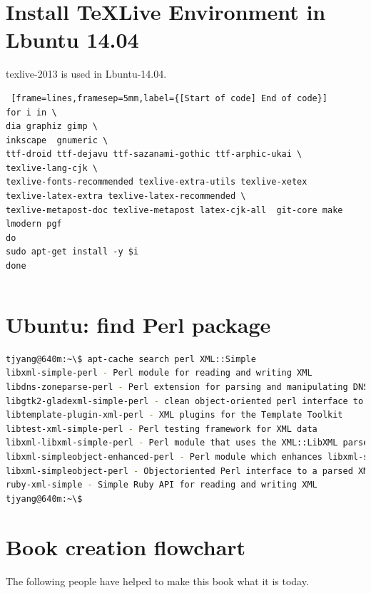 \section{Install \TeX Live Environment in Lbuntu 14.04}
texlive-2013 is used in Lbuntu-14.04.

\begin{Verbatim} [frame=lines,framesep=5mm,label={[Start of code] End of code}]
for i in \
dia graphiz gimp \
inkscape  gnumeric \
ttf-droid ttf-dejavu ttf-sazanami-gothic ttf-arphic-ukai \
texlive-lang-cjk \
texlive-fonts-recommended texlive-extra-utils texlive-xetex 
texlive-latex-extra texlive-latex-recommended \
texlive-metapost-doc texlive-metapost latex-cjk-all  git-core make lmodern pgf
do 
sudo apt-get install -y $i  
done

\end{Verbatim}

\begin{lstlisting}[language=Bash]
\end{lstlisting}

\section{Ubuntu: find Perl package}
\begin{lstlisting}[language=Bash]
tjyang@640m:~\$ apt-cache search perl XML::Simple
libxml-simple-perl - Perl module for reading and writing XML
libdns-zoneparse-perl - Perl extension for parsing and manipulating DNS Zone Files
libgtk2-gladexml-simple-perl - clean object-oriented perl interface to Gtk2::GladeXML
libtemplate-plugin-xml-perl - XML plugins for the Template Toolkit
libtest-xml-simple-perl - Perl testing framework for XML data
libxml-libxml-simple-perl - Perl module that uses the XML::LibXML parser for XML structures
libxml-simpleobject-enhanced-perl - Perl module which enhances libxml-simpleobject-perl
libxml-simpleobject-perl - Objectoriented Perl interface to a parsed XML::Parser tree
ruby-xml-simple - Simple Ruby API for reading and writing XML
tjyang@640m:~\$ 
\end{lstlisting}


\section{Book creation flowchart}
The following people have helped to make this book what it is today.

